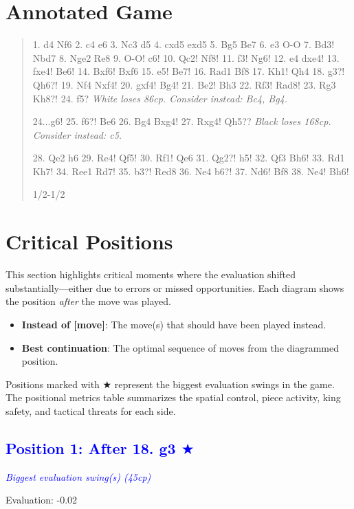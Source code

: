 \documentclass[11pt]{book}
\begin{document}
\section{Annotated Game}

\begin{quote}
1. d4 Nf6
2. c4 e6
3. Nc3 d5
4. cxd5 exd5
5. Bg5 Be7
6. e3 O-O
7. Bd3! Nbd7
8. Nge2 Re8
9. O-O! c6!
10. Qc2! Nf8!
11. f3! Ng6!
12. e4 dxe4!
13. fxe4! Be6!
14. Bxf6! Bxf6
15. e5! Be7!
16. Rad1 Bf8
17. Kh1! Qh4
18. g3?! Qh6?!
19. Nf4 Nxf4!
20. gxf4! Bg4!
21. Be2! Bh3
22. Rf3! Rad8!
23. Rg3 Kh8?!
24. f5?
\textit{White loses 86cp. Consider instead: Bc4, Bg4.}

24...g6!
25. f6?! Be6
26. Bg4 Bxg4!
27. Rxg4! Qh5??
\textit{Black loses 168cp. Consider instead: c5.}

28. Qe2 h6
29. Re4! Qf5!
30. Rf1! Qe6
31. Qg2?! h5!
32. Qf3 Bh6!
33. Rd1 Kh7!
34. Ree1 Rd7!
35. b3?! Red8
36. Ne4 b6?!
37. Nd6! Bf8
38. Ne4! Bh6!

1/2-1/2
\end{quote}

\section{Critical Positions}

This section highlights critical moments where the evaluation shifted substantially---either due to errors or missed opportunities. Each diagram shows the position \emph{after} the move was played.

\begin{itemize}
\item \textbf{Instead of [move]}: The move(s) that should have been played instead.
\item \textbf{Best continuation}: The optimal sequence of moves from the diagrammed position.
\end{itemize}

Positions marked with {\color{blue}$\bigstar$} represent the biggest evaluation swings in the game. The positional metrics table summarizes the spatial control, piece activity, king safety, and tactical threats for each side.

\subsection*{\textcolor{blue}{Position 1: After 18. g3 $\bigstar$}}
\textit{\textcolor{blue}{Biggest evaluation swing(s) (45cp)}}

Evaluation: -0.02
\end{document}
